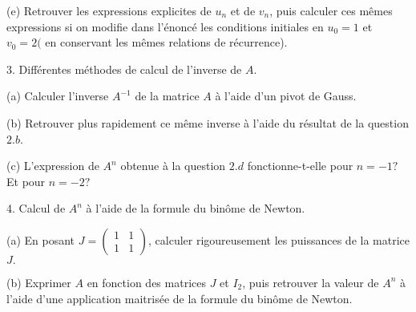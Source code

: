 \documentclass[a4paper, 11pt,reqno]{article}
\begin{document}
\begin{exercice}
(e) Retrouver les expressions explicites de $u_{n}$ et de $v_{n}$, puis calculer ces mêmes expressions si on modifie dans l'énoncé les conditions initiales en $u_{0}=1$ et $v_{0}=2($ en conservant les mêmes relations de récurrence).

3. Différentes méthodes de calcul de l'inverse de $A$.

(a) Calculer l'inverse $A^{-1}$ de la matrice $A$ à l'aide d'un pivot de Gauss.

(b) Retrouver plus rapidement ce même inverse à l'aide du résultat de la question $2 . b$.

(c) L'expression de $A^{n}$ obtenue à la question $2 . d$ fonctionne-t-elle pour $n=-1 ?$ Et pour $n=-2 ?$

4. Calcul de $A^{n}$ à l'aide de la formule du binôme de Newton.

(a) En posant $J=\left(\begin{array}{ll}1 & 1 \\ 1 & 1\end{array}\right)$, calculer rigoureusement les puissances de la matrice $J .$

(b) Exprimer $A$ en fonction des matrices $J$ et $I_{2}$, puis retrouver la valeur de $A^{n}$ à l'aide d'une application maitrisée de la formule du binôme de Newton. 

\end{exercice}
\end{document}
